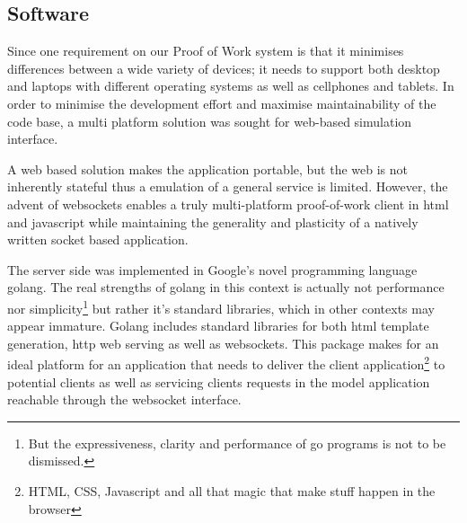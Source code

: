 

\subsection{Software}
Since one requirement on our Proof of Work system is that it minimises differences between a wide variety of devices; it needs to support both desktop and laptops with different operating systems as well as cellphones and tablets.
In order to minimise the development effort and maximise maintainability of the code base, a multi platform solution was sought for web-based simulation interface. 

A web based solution makes the application portable, but the web is not inherently stateful thus a emulation of a general service is limited. However, the advent of websockets enables a truly multi-platform proof-of-work client in html and javascript while maintaining the generality and plasticity of a natively written socket based application. 
\begin{comment}
The javascript implementation for handling the protocol is quite simple:
\jscode[firstline=57, firstnumber=57, lastline=84]{../pow.js}
The solution finding part also need to be presented:
\jscode[firstline=26, firstnumber=26, lastline=49]{../pow.js}
To trigger a request to be sent to the server we build the following function which is then registered to the onclick event of a button in the web gui:
\jscode[firstline=100, firstnumber=100, lastline=105]{../pow.js}
\end{comment}

The server side was implemented in Google's novel programming language golang\cite{golang}. The real strengths of golang in this context is actually not performance nor simplicity\footnote{But the expressiveness, clarity and performance of go programs is not to be dismissed.} but rather it's standard libraries, which in other contexts may appear immature. Golang includes standard libraries for both html template generation, http web serving as well as websockets. This package makes for an ideal platform for an application that needs to deliver the client application\footnote{HTML, CSS, Javascript and all that magic that make stuff happen in the browser} to potential clients as well as servicing clients requests in the model application reachable through the websocket interface. 

